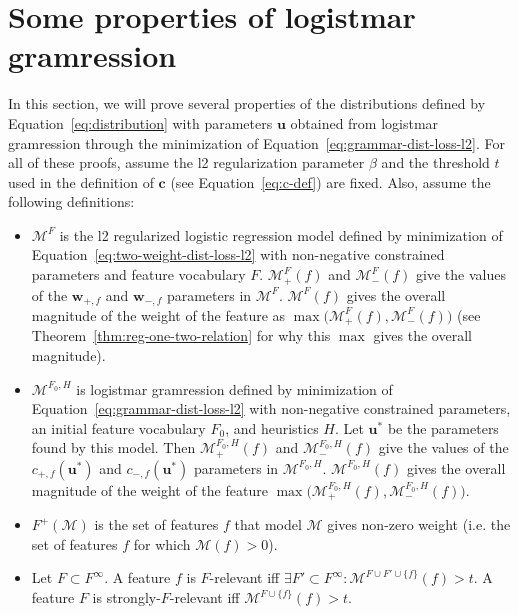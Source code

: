 \documentclass[11pt,letterpaper]{article}
\begin{document}
\section{Some properties of logistmar gramression}
\label{sec:lg-props}

In this section, we will prove several properties 
of the distributions defined by 
Equation~\ref{eq:distribution} 
with parameters $\mathbf{u}$ obtained
from logistmar gramression through the
minimization of Equation~\ref{eq:grammar-dist-loss-l2}.
For all of these proofs, assume the l2 regularization
parameter $\beta$ and the threshold $t$ used in the
definition of $\mathbf{c}$ 
(see Equation~\ref{eq:c-def}) are 
fixed.  Also, assume the following definitions:

\begin{itemize}
\item $\mathcal{M}^F$ is the 
l2 regularized
logistic regression model defined by minimization of
Equation~\ref{eq:two-weight-dist-loss-l2} with 
non-negative constrained parameters and 
feature vocabulary $F$. $\mathcal{M}^F_+(f)$ and
$\mathcal{M}^F_-(f)$ give the
values of the $\mathbf{w}_{+,f}$ and
 $\mathbf{w}_{-,f}$ parameters in
 $\mathcal{M}^F$.  $\mathcal{M}^F(f)$
gives the overall magnitude of the weight of the
feature as 
$\max\big(\mathcal{M}^F_+(f),\mathcal{M}^F_-(f) \big)$
(see Theorem~\ref{thm:reg-one-two-relation} for why
this $\max$ gives the overall magnitude).

\item $\mathcal{M}^{F_0,H}$ is logistmar gramression
 defined by minimization of
 Equation~\ref{eq:grammar-dist-loss-l2} with non-negative constrained parameters, an initial
 feature vocabulary $F_0$, and heuristics $H$.  Let
 $\mathbf{u}^*$ be the parameters found by this model.
 Then $\mathcal{M}^{F_0,H}_+(f)$ and
$\mathcal{M}^{F_0,H}_-(f)$ give the
values of the $c_{+,f}(\mathbf{u}^*)$ and 
$c_{-,f}(\mathbf{u}^*)$ parameters in
 $\mathcal{M}^{F_0,H}$.  $\mathcal{M}^{F_0,H}(f)$
gives the overall magnitude of the weight of the
feature 
$\max\big(\mathcal{M}^{F_0,H}_+(f),\mathcal{M}^{F_0,H}_-(f) \big)$.
  
\item $F^+(\mathcal{M})$ is the set of features $f$ 
that model $\mathcal{M}$ gives non-zero weight (i.e. the
set of features $f$ for which 
$\mathcal{M}(f)>0$).

\item Let $F\subset F^{\infty}$.  A feature $f$ is 
$F$-relevant iff $\exists F'\subset F^{\infty}:
 \mathcal{M}^{F\cup F'\cup\{f\}}(f)>t$.  A
 feature $F$ is strongly-$F$-relevant iff 
 $\mathcal{M}^{F\cup\{f\}}(f)>t$.


\end{itemize}
\end{document}
